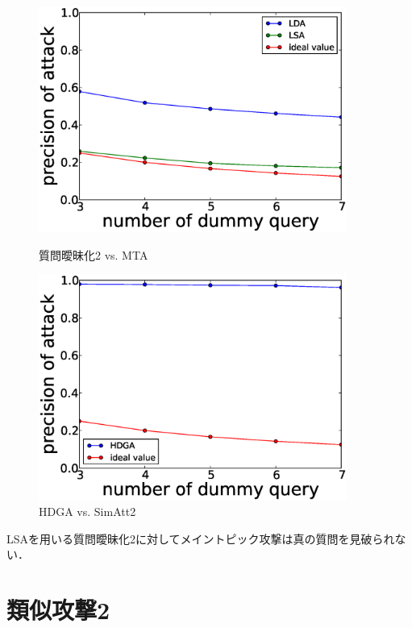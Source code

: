 \documentclass[master]{suribt}
\theoremstyle{definition}
\begin{document}
 \begin{figure}
 \begin{minipage}[t]{0.5\linewidth}
 \centering
 \includegraphics[width=0.9\textwidth]{BBBB1.eps}
 \vspace{5em}
 \caption{質問曖昧化2 vs. MTA}
 \label{fig:mt:BBBB}
 \end{minipage}%
 \begin{minipage}[t]{0.5\linewidth}
 \centering
 \includegraphics[width=0.9\textwidth]{HDGA1.eps}
 \vspace{5em}
 \caption{HDGA vs. SimAtt2}
 \label{fig:s2:HDGA}
 \end{minipage}
 \end{figure}


 LSAを用いる質問曖昧化2に対してメイントピック攻撃は真の質問を見破られない．


 \section{類似攻撃2}
\end{document}
